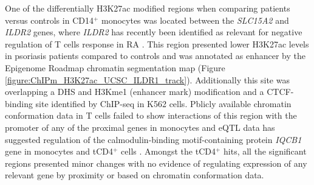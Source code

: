 One of the differentially H3K27ac modified regions when comparing patients versus controls in CD14$^+$ monocytes was located between the \textit{SLC15A2} and \textit{ILDR2} genes, where \textit{ILDR2} has recently been identified as relevant for negative regulation of T cells response in RA \parencite{Hecht2018}. This region presented lower H3K27ac levels in psoriasis patients compared to controls and was annotated as enhancer by the Epigenome Roadmap chromatin segmentation map (Figure \ref{figure:ChIPm_H3K27ac_UCSC_ILDR1_track}). Additionally this site was overlapping a DHS and H3Kme1 (enhancer mark) modification and a CTCF-binding site identified by ChIP-seq in K562 cells. Pblicly available chromatin conformation data in T cells failed to show interactions of this region with the promoter of any of the proximal genes in monocytes and eQTL data has suggested regulation of the calmodulin-binding motif-containing protein \textit{IQCB1} gene in monocytes and tCD4$^+$ cells \parencite{GTeX,Fairfax2014, Kasela2017}. Amongst the tCD4$^+$ hits, all the significant regions presented minor changes with no evidence of regulating expression of any relevant gene by proximity or based on chromatin conformation data. 





